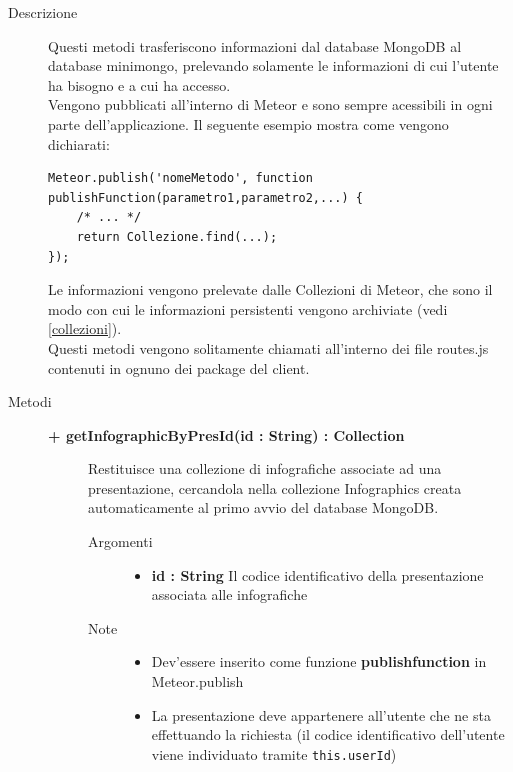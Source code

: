 \begin{description}
\item[Descrizione] \hfill
	Questi metodi trasferiscono informazioni dal database MongoDB al database minimongo, prelevando solamente le informazioni di cui l'utente ha bisogno e a cui ha accesso. \\
Vengono pubblicati all'interno di Meteor e sono sempre acessibili in ogni parte dell'applicazione. Il seguente esempio mostra come vengono dichiarati: 
\color{blue}\begin{lstlisting}[frame=single]
Meteor.publish('nomeMetodo', function publishFunction(parametro1,parametro2,...) {
	/* ... */
   	return Collezione.find(...);
});
\end{lstlisting}\color{black}
Le informazioni vengono prelevate dalle Collezioni di Meteor, che sono il modo con cui le informazioni persistenti vengono archiviate (vedi \ref{collezioni}). \\
Questi metodi vengono solitamente chiamati all'interno dei file routes.js contenuti in ognuno dei package del client.




	
	
\item[Metodi] \hfill
	
	\begin{description}
		\item[\textbf{\color{blue}+ getInfographicByPresId(id : String) : Collection			}] \hfill
			Restituisce una collezione di infografiche associate ad una presentazione, cercandola nella collezione Infographics creata automaticamente al primo avvio del database MongoDB. 
			
		\begin{description}
			\item[Argomenti] \hfill
				\begin{itemize}
				
					\item \textbf{id : String			} \hfill
					Il codice identificativo della presentazione associata alle infografiche
					
				\end{itemize}
			\item[Note] \hfill
			\begin{itemize}
					\item Dev'essere inserito come funzione \textbf{publishfunction} in Meteor.publish
					\item La presentazione deve appartenere all'utente che ne sta effettuando la richiesta (il codice identificativo dell'utente viene individuato tramite \texttt{this.userId})
				\end{itemize}
		\end{description}
	\end{description}
	

\end{description}
